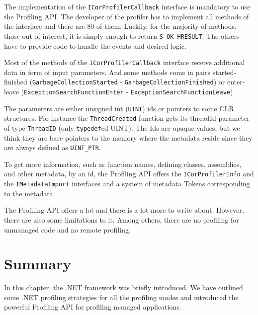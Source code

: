 The implementation of the \texttt{ICorProfilerCallback} interface is mandatory to use the Profiling API. The developer of the profiler has to implement all methods of the interface and there are 80 of them. Luckily, for the majority of methods, those out of interest, it is simply enough to return \texttt{S\_OK HRESULT}. The others have to provide code to handle the events and desired logic.

Most of the methods of the \texttt{ICorProfilerCallback} interface receive additional data in form of input parameters. And some methods come in pairs started-finished \linebreak(\texttt{GarbageCollectionStarted} - \texttt{GarbageCollectionFinished}) or enter-leave \linebreak(\texttt{ExceptionSearchFunctionEnter} -  \texttt{ExceptionSearchFunctionLeave}). 

The parameters are either unsigned int (\texttt{UINT}) ids or pointers to some CLR structures. For instance the \texttt{ThreadCreated} function gets its threadId parameter of type \texttt{ThreadID} (only \texttt{typedef}ed UINT). The Ids are opaque values, but we think they are bare pointers to the memory where the metadata reside since they are always defined as \texttt{UINT\_PTR}.

To get more information, such as function names, defining classes, assemblies, and other metadata, by an id, the Profiling API offers the \texttt{ICorProfilerInfo} and the \texttt{IMetadataImport} interfaces and a system of metadata Tokens corresponding to the metadata.

The Profiling API offers a lot and there is a lot more to write about. However, there are also some limitations to it. Among others, there are no profiling for unmanaged code and no remote profiling. 

\section{Summary}
In this chapter, the .NET framework was briefly introduced. We have outlined some .NET profiling strategies for all the profiling modes and introduced the powerful Profiling API for profiling managed applications.
